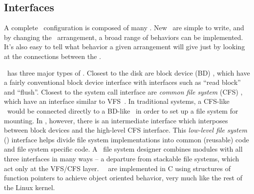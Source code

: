 \subsection {Interfaces}
\label{sec:modules:interfaces}

A complete \Kudos\ configuration is composed of many \modules. New \modules\ are
simple to write, and by changing the \module\ arrangement, a broad range of
behaviors can be implemented. It's also easy to tell what behavior a given
arrangement will give just by looking at the connections between the \modules.

\Kudos\ has three major types of \modules.
%
Closest to the disk are block device (BD) \modules, which have a fairly
conventional block device interface with interfaces such as ``read block'' and
``flush''. 
%
Closest to the system call interface are \emph{common file system} (CFS)
\modules, which have an interface similar to VFS~\cite{kleiman86vnodes}. 
%
In traditional systems, a CFS-like \module\ would be connected directly to a
BD-like \module\ in order to set up a file system for mounting. In \Kudos,
however, there is an intermediate interface which interposes between block
devices and the high-level CFS interface.
%
This \emph{low-level file system} (\LFS) interface helps divide file system
implementations into common (reusable) code and file system specific code. A
\Kudos\ file system designer combines modules with all three interfaces in many
ways -- a departure from stackable file systems, which act only at the VFS/CFS
layer. \Kudos\ \modules\ are implemented in C using structures of function
pointers to achieve object oriented behavior, very much like the rest of the
Linux kernel.

